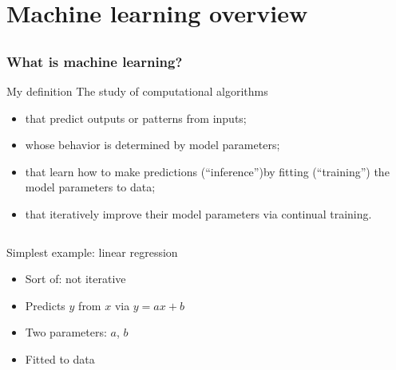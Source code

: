 \section[ML overview]{Machine learning overview}

\subsection{}

\begin{frame}
    \frametitle{What is machine learning?}

    \begin{block}{My definition}
        The study of computational algorithms
        \begin{itemize}
            \item that \alert{predict} outputs or patterns from inputs;
            \item whose behavior is determined by \alert{model parameters};
            \item that \alert{learn} how to make predictions (``inference'')by fitting (``training'') the model parameters to data;
            \item that \alert{iteratively} improve their model parameters via continual training.
        \end{itemize}
    \end{block}
    \pause

    \begin{columns}
        \begin{column}{2.5in}
            Simplest example: linear regression
            \begin{itemize}
                \item Sort of: not iterative
                \item Predicts $y$ from $x$ via $y = ax + b$
                \item Two parameters: $a$, $b$
                \item Fitted to data
            \end{itemize}
        \end{column}
        \begin{column}{1.75in}
        \end{column}
    \end{columns}
\end{frame}


